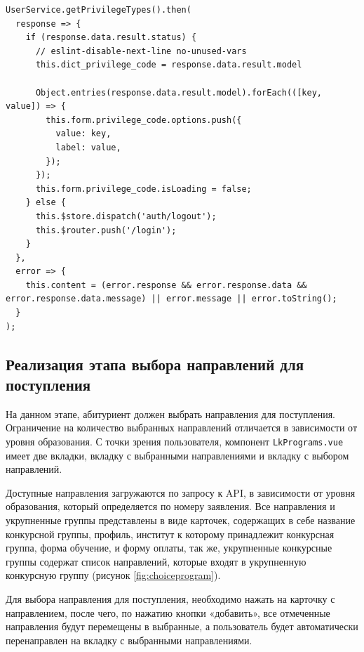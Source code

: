 \begin{lstlisting}[caption={Метод загружающий список список типов льгот}, label={ls:getprivilegy}]
UserService.getPrivilegeTypes().then(
  response => {
    if (response.data.result.status) {
      // eslint-disable-next-line no-unused-vars
      this.dict_privilege_code = response.data.result.model

      Object.entries(response.data.result.model).forEach(([key, value]) => {
        this.form.privilege_code.options.push({
          value: key,
          label: value,
        });
      });
      this.form.privilege_code.isLoading = false;
    } else {
      this.$store.dispatch('auth/logout');
      this.$router.push('/login');
    }
  },
  error => {
    this.content = (error.response && error.response.data && error.response.data.message) || error.message || error.toString();
  }
);
\end{lstlisting}

\subsection{Реализация этапа выбора направлений для поступления}

На данном этапе, абитуриент должен выбрать направления для поступления. Ограничение на количество выбранных направлений отличается в зависимости от уровня образования. С точки зрения пользователя, компонент \verb|LkPrograms.vue| имеет две вкладки, вкладку с выбранными направлениями и вкладку с выбором направлений.

Доступные направления загружаются по запросу к API, в зависимости от уровня образования, который определяется по номеру заявления. Все направления и укрупненные группы представлены в виде карточек, содержащих в себе название конкурсной группы, профиль, институт к которому принадлежит конкурсная группа, форма обучение, и форму оплаты, так же, укрупненные конкурсные группы содержат список направлений, которые входят в укрупненную конкурсную группу (рисунок \ref{fig:choiceprogram}).

Для выбора направления для поступления, необходимо нажать на карточку с направлением, после чего, по нажатию кнопки «добавить», все отмеченные направления будут перемещены в выбранные, а пользователь будет автоматически перенаправлен на вкладку с выбранными направлениями.


